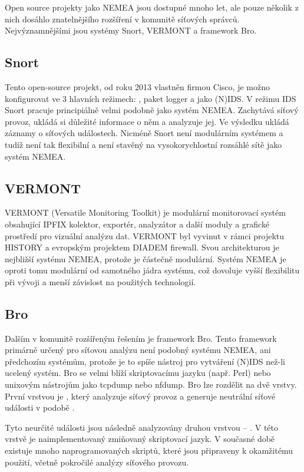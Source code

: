 Open source projekty jako NEMEA jsou dostupné mnoho let, ale pouze několik z nich dosáhlo znatelnějšího rozšíření v komunitě síťových správců. Nejvýznamnějšími jsou systémy Snort\cite{snort}, VERMONT\cite{vermont} a framework Bro\cite{bro}. 

\subsection*{Snort}
Tento open-source projekt, od roku 2013 vlastněn firmou Cisco\cite{snort:cisco}, je možno konfigurovat ve 3 hlavních režimech\cite{snort:modes}: , paket logger a jako (N)IDS. V režimu IDS Snort pracuje principiálně velmi podobně jako systém NEMEA. Zachytává síťový provoz, ukládá si důležité informace o něm a analyzuje jej. Ve výsledku ukládá záznamy o síťových událostech. Nicméně Snort není modulárním systémem a tudíž není tak flexibilní a není stavěný na vysokorychlostní rozsáhlé sítě jako systém NEMEA.

\subsection*{VERMONT}

VERMONT (Versatile Monitoring Toolkit) je modulární monitorovací systém obsahující IPFIX kolektor, exportér, analyzátor a další moduly a grafické prostředí pro vizuální analýzu dat. VERMONT byl vyvinut v rámci projektu HISTORY\cite{vermont:history} a evropským projektem DIADEM firewall\cite{vermont:diadem}. Svou architekturou je nejbližší systému NEMEA, protože je částečně modulární. Systém NEMEA je oproti tomu modulární od samotného jádra systému, což dovoluje vyšší flexibilitu při vývoji a menší závislost na použitých technologií.

\subsection*{Bro}
Dalším v komunitě rozšířeným řešením je framework Bro. Tento framework primárně určený pro síťovou analýzu není podobný systému NEMEA, ani předchozím systémům, protože je to spíše nástroj pro vytváření (N)IDS než-li ucelený systém. Bro se velmi blíží skriptovacímu jazyku (např. Perl) nebo unixovým nástrojům jako tcpdump nebo nfdump. Bro lze rozdělit na dvě vrstvy. První vrstvou je , který analyzuje síťový provoz a generuje neutrální síťové události v podobě . 

Tyto neurčité události jsou následně analyzovány druhou vrstvou -- . V této vrstvě je naimplementovaný zmiňovaný skriptovací jazyk. V současné době existuje mnoho naprogramovaných skriptů, které jsou připraveny k okamžitému použití, včetně pokročilé analýzy síťového provozu.

